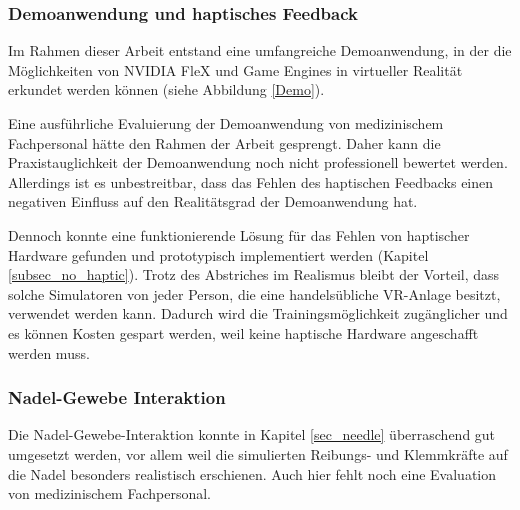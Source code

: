 \subsubsection{Demoanwendung und haptisches Feedback}
Im Rahmen dieser Arbeit entstand eine umfangreiche Demoanwendung, in der die Möglichkeiten von NVIDIA FleX und Game Engines in virtueller Realität erkundet werden können (siehe Abbildung \ref{Demo}). 


Eine ausführliche Evaluierung der Demoanwendung von medizinischem Fachpersonal hätte den Rahmen der Arbeit gesprengt. Daher kann die Praxistauglichkeit der Demoanwendung noch nicht professionell bewertet werden.
Allerdings ist es unbestreitbar, dass das Fehlen des haptischen Feedbacks einen negativen Einfluss auf den Realitätsgrad der Demoanwendung hat.

Dennoch konnte eine funktionierende Lösung für das Fehlen von haptischer Hardware gefunden und prototypisch implementiert werden (Kapitel \ref{subsec_no_haptic}). %
Trotz des Abstriches im Realismus bleibt der Vorteil, dass solche Simulatoren von jeder Person, die eine handelsübliche VR-Anlage besitzt, verwendet werden kann. Dadurch wird die Trainingsmöglichkeit zugänglicher und es können Kosten gespart werden, weil keine haptische Hardware angeschafft werden muss.


\subsubsection{Nadel-Gewebe Interaktion}
Die Nadel-Gewebe-Interaktion konnte in Kapitel \ref{sec_needle} überraschend gut umgesetzt werden, vor allem weil die simulierten Reibungs- und Klemmkräfte auf die Nadel besonders realistisch erschienen. Auch hier fehlt noch eine Evaluation von medizinischem Fachpersonal.

